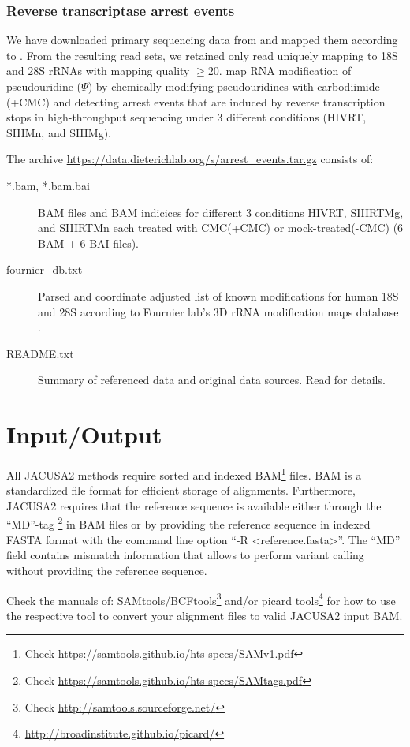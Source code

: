 \documentclass[10pt,a4paper]{article} \usepackage[utf8]{inputenc}
\begin{document}
\subsubsection{Reverse transcriptase arrest events}
We have downloaded primary sequencing data from \cite{Zhou2018} and mapped them according to
.
From the resulting read sets, we retained only read uniquely mapping to 18S and 28S rRNAs with
mapping quality $\ge 20$.
\cite{Zhou2018} map RNA modification of pseudouridine ($\Psi$) by chemically modifying
pseudouridines with carbodiimide (+CMC) and detecting arrest events that are induced by reverse
transcription stops in high-throughput sequencing under 3 different conditions (HIVRT, SIIIMn, and
SIIIMg).

The archive \url{https://data.dieterichlab.org/s/arrest_events.tar.gz} consists of:
\begin{description}
  \item[*.bam, *.bam.bai] BAM files and BAM indicices for different 3 conditions HIVRT, SIIIRTMg,
  and SIIIRTMn each treated with CMC(+CMC) or mock-treated(-CMC) (6 BAM + 6 BAI files).
  \item[fournier\_db.txt] Parsed and coordinate adjusted list of known modifications for human 18S
  and 28S according to Fournier lab's 3D rRNA modification maps database \cite{PieknaPrzybylska2007}.
  \item[README.txt] Summary of referenced data and original data sources. Read for details.
\end{description}
\section{Input/Output}
All JACUSA2 methods require sorted and indexed BAM\footnote{Check 
\url{https://samtools.github.io/hts-specs/SAMv1.pdf}} files.
BAM is a standardized file format for efficient storage of alignments.
Furthermore, JACUSA2 requires that the reference sequence is available either through the ``MD''-tag
\footnote{Check \url{https://samtools.github.io/hts-specs/SAMtags.pdf}} in BAM files or by providing 
the reference sequence in indexed FASTA format with the command line option ``-R <reference.fasta>''.
The ``MD'' field contains mismatch information that allows to perform variant calling without
providing the reference sequence.

Check the manuals of: SAMtools/BCFtools\footnote{Check \url{http://samtools.sourceforge.net/}} and/or
picard tools\footnote{\url{http://broadinstitute.github.io/picard/}} for how to use the respective tool to
convert your alignment files to valid JACUSA2 input BAM.
\end{document}

